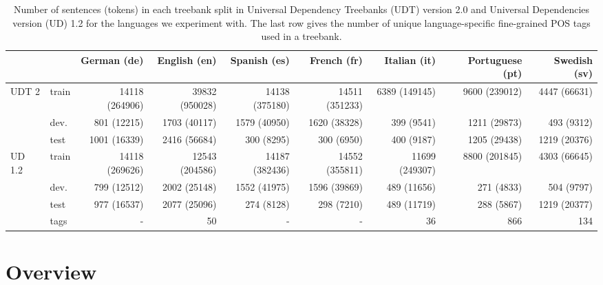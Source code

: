 \documentclass[11pt]{article}
\begin{document}
\begin{table*}[!]
\setlength{\tabcolsep}{.375em}
\centering
\scriptsize
\begin{tabular}{ll|rrrrrrr}
														&             & German (de) & English (en)  & Spanish (es) & French (fr) & Italian (it) & Portuguese (pt) & Swedish (sv) \\ \hline
\multicolumn{1}{l|}{\multirow{3}{*}{UDT 2}}				& train       & 14118 (264906)  & 39832 (950028)   & 14138 (375180)   & 14511 (351233)  & 6389 (149145)    & 9600 (239012)       & 4447 (66631)     \\ \cline{2-9} 
\multicolumn{1}{l|}{}										& dev.         & 801 (12215)     & 1703 (40117)     & 1579 (40950)     & 1620 (38328)    & 399 (9541)       & 1211 (29873)        & 493 (9312)       \\ \cline{2-9} 
\multicolumn{1}{l|}{}										& test        & 1001 (16339)    & 2416 (56684)     & 300 (8295)       & 300 (6950)      & 400 (9187)       & 1205 (29438)        & 1219 (20376)     \\ \hline
\multicolumn{1}{l|}{\multirow{4}{*}{UD 1.2}}        		& train       & 14118 (269626)  & 12543 (204586)   & 14187 (382436)   & 14552 (355811)  & 11699 (249307)   & 8800 (201845)       & 4303 (66645)     \\ \cline{2-9} 
\multicolumn{1}{l|}{}										& dev.         & 799 (12512)     & 2002 (25148)     & 1552 (41975)     & 1596 (39869)    & 489 (11656)      & 271 (4833)          & 504 (9797)       \\ \cline{2-9} 
\multicolumn{1}{l|}{}										& test        & 977 (16537)     & 2077 (25096)     & 274 (8128)       & 298 (7210)      & 489 (11719)      & 288 (5867)          & 1219 (20377)     \\ \cline{2-9} 
\multicolumn{1}{l|}{}										& tags & -               & 50               & -                & -               & 36               & 866                 & 134              \\ \hline
\end{tabular}
\caption{Number of sentences (tokens) in each treebank split in Universal Dependency Treebanks  (UDT) version 2.0  and Universal Dependencies version (UD) 1.2 for the languages we experiment with. The last row gives the number of unique language-specific fine-grained POS tags used in a treebank.}
\label{tab:treebanks}
\end{table*}

\section{Overview}
\end{document}
